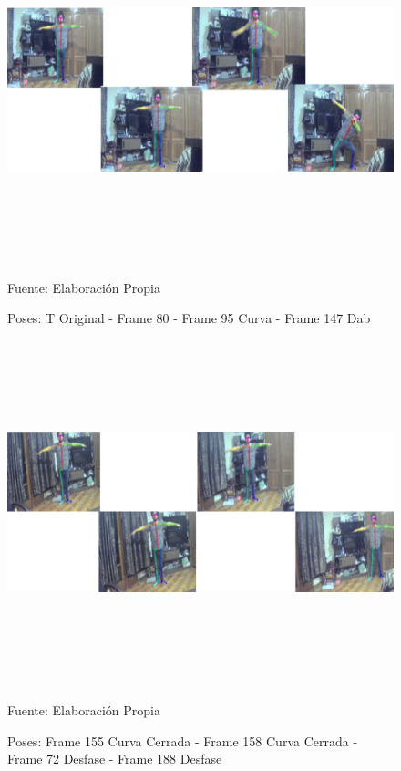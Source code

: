 \begin{figure}[ht]
	\centering
	\includegraphics[width=16cm,height=10cm,]{./Images/checkerpart1.png}
	\caption{Poses: T Original - Frame 80 - Frame 95 Curva - Frame 147 Dab}
	\footnotesize Fuente: Elaboración Propia
	\label{checker1}
\end{figure}

\begin{figure}[ht]
	\centering
	\includegraphics[width=16cm,height=10cm]{./Images/checkerpart2.png}
	\caption{Poses: Frame 155 Curva Cerrada - Frame 158 Curva Cerrada - Frame 72 Desfase - Frame 188 Desfase}
	\footnotesize Fuente: Elaboración Propia
	\label{checker2}
\end{figure}

\clearpage


